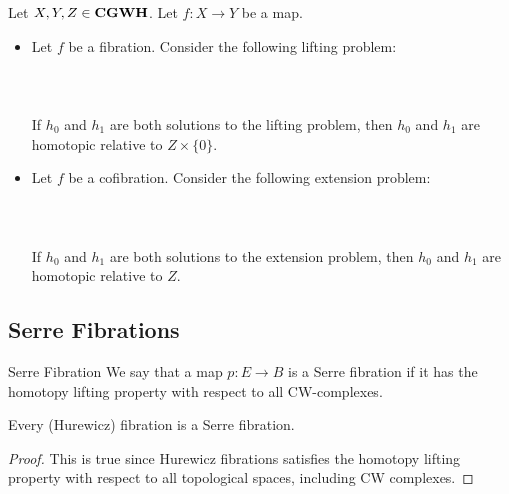 \documentclass[a4paper]{article}
\begin{document}
\begin{prp}{}{} Let $X,Y,Z\in\bold{CGWH}$. Let $f:X\to Y$ be a map. 
\begin{itemize}
\item Let $f$ be a fibration. Consider the following lifting problem: \\~\\
\\~\\
If $h_0$ and $h_1$ are both solutions to the lifting problem, then $h_0$ and $h_1$ are homotopic relative to $Z\times\{0\}$. 
\item Let $f$ be a cofibration. Consider the following extension problem: \\~\\
\\~\\
If $h_0$ and $h_1$ are both solutions to the extension problem, then $h_0$ and $h_1$ are homotopic relative to $Z$. 
\end{itemize}
\end{prp}

\subsection{Serre Fibrations}
\begin{defn}{Serre Fibration}{} We say that a map $p:E\to B$ is a Serre fibration if it has the homotopy lifting property with respect to all CW-complexes. 
\end{defn}

\begin{lmm}{}{} Every (Hurewicz) fibration is a Serre fibration. \tcbline
\begin{proof}
This is true since Hurewicz fibrations satisfies the homotopy lifting property with respect to all topological spaces, including CW complexes. 
\end{proof}
\end{lmm}
\end{document}
